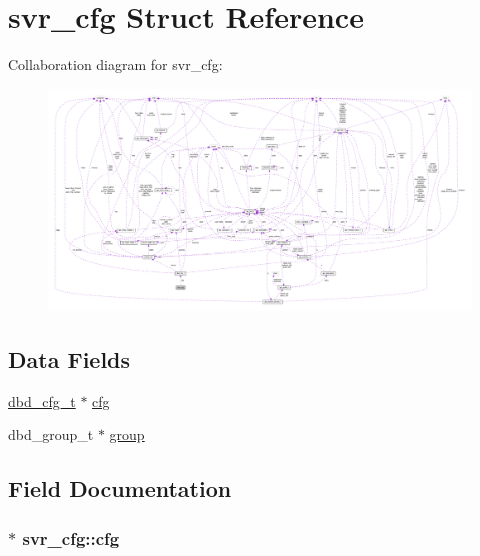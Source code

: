 \hypertarget{structsvr__cfg}{}\section{svr\+\_\+cfg Struct Reference}
\label{structsvr__cfg}


Collaboration diagram for svr\+\_\+cfg\+:
\nopagebreak
\begin{figure}[H]
\begin{center}
\leavevmode
\includegraphics[width=350pt]{structsvr__cfg__coll__graph}
\end{center}
\end{figure}
\subsection*{Data Fields}
\begin{DoxyCompactItemize}
\item 
\hyperlink{structdbd__cfg__t}{dbd\+\_\+cfg\+\_\+t} $\ast$ \hyperlink{structsvr__cfg_aaa3115f2b419d426a5b5eca4ac2c9a1a}{cfg}
\item 
dbd\+\_\+group\+\_\+t $\ast$ \hyperlink{structsvr__cfg_a72be9dba59243d9504d144dc9d63f56a}{group}
\end{DoxyCompactItemize}


\subsection{Field Documentation}
\subsubsection[{\texorpdfstring{cfg}{cfg}}]{$\ast$ svr\+\_\+cfg\+::cfg}\hypertarget{structsvr__cfg_aaa3115f2b419d426a5b5eca4ac2c9a1a}{}\label{structsvr__cfg_aaa3115f2b419d426a5b5eca4ac2c9a1a}
